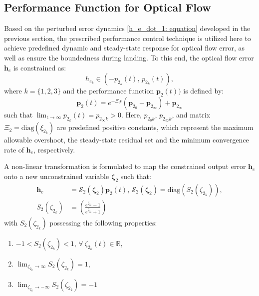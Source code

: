 \documentclass[lettersize,journal]{IEEEtran}
\begin{document}
\subsection{Performance Function for Optical Flow}
Based on the perturbed error dynamics \eqref{h_e_dot_1: equation} developed in the previous section, the prescribed performance control technique is utilized here to achieve predefined dynamic and steady-state response for optical flow error, as well as ensure the boundedness during landing.
To this end, the optical flow error $\boldsymbol{h}_{e}$ is constrained as:
\begin{equation}
    h_{e_k} \in (- p_{2_k}(t), \, p_{2_k}(t)),
\end{equation}
where $k = \{1, 2, 3\}$ and the performance function $\boldsymbol{p}_{2}(t))$ is defined by:
\begin{equation}
    \boldsymbol{p}_2(t) = e^{-\Xi_i t} (\boldsymbol{p}_{2_0} - \boldsymbol{p}_{2_\infty}) + \boldsymbol{p}_{2_\infty}   
\end{equation}
such that
$\lim_{\text{t} \to \infty} p_{2_k}(t) = p_{2_\infty k} > 0$. Here, $p_{2_0 k}$, $p_{2_\infty k}$, and matrix $\Xi_2 = \text{diag}(\xi_{2_k})$ are predefined positive constants, which represent the maximum allowable overshoot, the steady-state residual set and the minimum convergence rate of $\boldsymbol{h}_{e}$, respectively.

A non-linear transformation is formulated to map the constrained output error $\boldsymbol{h}_{e}$ onto a new unconstrained variable $\boldsymbol{\zeta}_{2}$ such that:
\begin{align}
    \label{optical flow error transformation: equation}
    \boldsymbol{h}_{e} &= \mathcal{S}_2(\boldsymbol{\zeta}_2) \boldsymbol{p}_2(t), \, \mathcal{S}_2(\boldsymbol{\zeta}_2) = \text{diag}(S_2(\zeta_{2_k})), \nonumber \\
    S_2(\zeta_{2_k}) &= \left(\frac{e^{\zeta_{2_k}} - 1}{e^{\zeta_{2_k}} + 1} \right)
\end{align}
with $S_2(\zeta_{2_k})$ possessing the following properties:
\begin{enumerate}
    \item[I.] $ -1 < S_2(\zeta_{2_k}) < 1 $, $\forall~\zeta_{2_k}(t) \in \mathbb{R},$ 
    \item[II.] $\lim_{\zeta_{2_k} \to \infty} S_2(\zeta_{2_k}) = 1$,
    \item[III.] $\lim_{\zeta_{2_k} \to -\infty} S_2(\zeta_{2_k}) = -1$
\end{enumerate}
\end{document}
